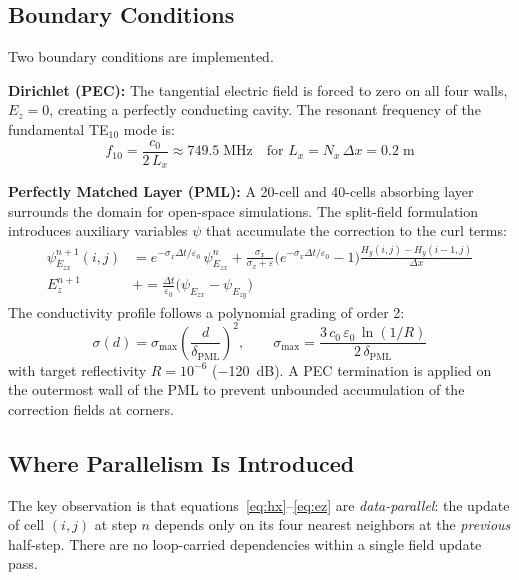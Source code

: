 \documentclass[12pt,a4paper]{article}
\begin{document}
\subsection{Boundary Conditions}

Two boundary conditions are implemented.

\textbf{Dirichlet (PEC):} The tangential electric field is forced to
zero on all four walls, $E_z = 0$, creating a perfectly conducting
cavity. The resonant frequency of the fundamental TE$_{10}$ mode is:
\begin{equation}
    f_{10} = \frac{c_0}{2\,L_x} \approx 749.5\;\text{MHz}
    \quad \text{for } L_x = N_x\,\Delta x = 0.2\;\text{m}
\end{equation}

\textbf{Perfectly Matched Layer (PML):} A 20-cell and 40-cells absorbing layer
surrounds the domain for open-space simulations.
The split-field formulation introduces auxiliary variables $\psi$
that accumulate the correction to the curl terms:
\begin{align}
\psi_{E_{zx}}^{n+1}(i,j) &= e^{-\sigma_x \Delta t/\varepsilon_0}\,\psi_{E_{zx}}^n
    + \frac{\sigma_x}{\sigma_x+\varepsilon}\bigl(e^{-\sigma_x\Delta t/\varepsilon_0}-1\bigr)
      \frac{H_y(i,j)-H_y(i-1,j)}{\Delta x}\\[4pt]
E_z^{n+1} &\mathrel{+}= \frac{\Delta t}{\varepsilon_0}
    \bigl(\psi_{E_{zx}} - \psi_{E_{zy}}\bigr)
\end{align}
The conductivity profile follows a polynomial grading of order 2:
\begin{equation}
    \sigma(d) = \sigma_{\max}\left(\frac{d}{\delta_{\text{PML}}}\right)^2,
    \qquad
    \sigma_{\max} = \frac{3\,c_0\,\varepsilon_0\,\ln(1/R)}{2\,\delta_{\text{PML}}}
\end{equation}
with target reflectivity $R = 10^{-6}$ ($-$120~dB).
A PEC termination is applied on the outermost wall of the PML to
prevent unbounded accumulation of the correction fields at corners.

\subsection{Where Parallelism Is Introduced}

The key observation is that equations~\eqref{eq:hx}--\eqref{eq:ez}
are \emph{data-parallel}: the update of cell $(i,j)$ at step $n$
depends only on its four nearest neighbors at the \emph{previous}
half-step.
There are no loop-carried dependencies within a single field update
pass.
\end{document}
